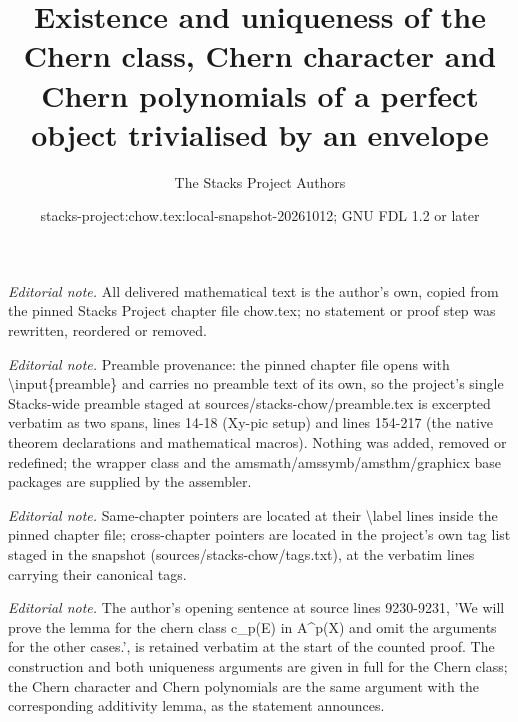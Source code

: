 \documentclass[10pt,a4paper]{amsart}
\title{Existence and uniqueness of the Chern class, Chern character and Chern polynomials of a perfect object trivialised by an envelope}
\author{The Stacks Project Authors}
\date{stacks-project:chow.tex:local-snapshot-20261012; GNU FDL 1.2 or later}
\theoremstyle{plain}
\theoremstyle{definition}
\theoremstyle{remark}
\numberwithin{equation}{subsection}
\begin{document}
\maketitle
\noindent\textit{Editorial note.} All delivered mathematical text is the author's own, copied from the pinned Stacks Project chapter file chow.tex; no statement or proof step was rewritten, reordered or removed.\par\medskip
\noindent\textit{Editorial note.} Preamble provenance: the pinned chapter file opens with \textbackslash{}input\{preamble\} and carries no preamble text of its own, so the project's single Stacks-wide preamble staged at sources/stacks-chow/preamble.tex is excerpted verbatim as two spans, lines 14-18 (Xy-pic setup) and lines 154-217 (the native theorem declarations and mathematical macros). Nothing was added, removed or redefined; the wrapper class and the amsmath/amssymb/amsthm/graphicx base packages are supplied by the assembler.\par\medskip
\noindent\textit{Editorial note.} Same-chapter pointers are located at their \textbackslash{}label lines inside the pinned chapter file; cross-chapter pointers are located in the project's own tag list staged in the snapshot (sources/stacks-chow/tags.txt), at the verbatim lines carrying their canonical tags.\par\medskip
\noindent\textit{Editorial note.} The author's opening sentence at source lines 9230-9231, 'We will prove the lemma for the chern class c\_p(E) in A\textasciicircum{}p(X) and omit the arguments for the other cases.', is retained verbatim at the start of the counted proof. The construction and both uniqueness arguments are given in full for the Chern class; the Chern character and Chern polynomials are the same argument with the corresponding additivity lemma, as the statement announces.\par\medskip
\end{document}
